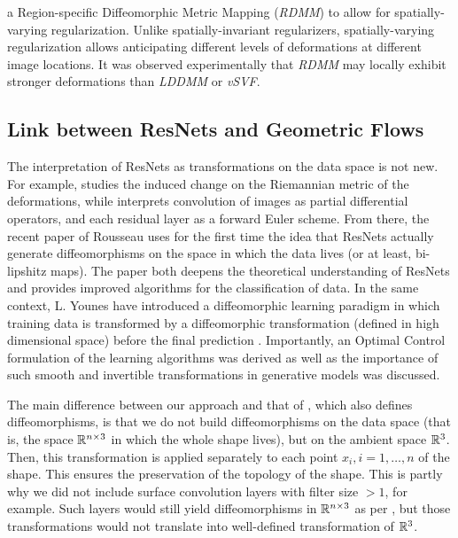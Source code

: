 \cite{shen2019region} a Region-specific Diffeomorphic Metric Mapping (\textit{RDMM}) to allow for spatially-varying regularization. Unlike spatially-invariant regularizers, spatially-varying regularization allows anticipating different levels of deformations at different image locations. It was observed experimentally that \textit{RDMM} may locally exhibit stronger deformations than \textit{LDDMM} or \textit{vSVF}. \\

\subsection{Link between ResNets and Geometric Flows}
\label{sec:LinkResNet-LDDMM}

The interpretation of ResNets as transformations on the data space is not new. For example, \cite{NIPS2017_0ebcc77d} studies the induced change on the Riemannian metric of the deformations, while \cite{ruthotto2019deep} interprets convolution of images as partial differential operators, and each residual layer as a forward Euler scheme. From there, the recent paper \cite{rousseau2020residual} of Rousseau \etal uses for the first time the idea that ResNets actually generate diffeomorphisms on the space in which the data lives (or at least, bi-lipshitz maps). The paper both deepens the theoretical understanding of ResNets and provides improved algorithms for the classification of data. In the same context, L. Younes have introduced a diffeomorphic learning paradigm in which training data is transformed by a diffeomorphic transformation (defined in high dimensional space) before the final prediction \cite{younes2019diffeomorphic}. Importantly, an Optimal Control formulation of the learning algorithms was derived as well as the importance of such smooth and invertible transformations in generative models was discussed. 

The main difference between our approach and that of  \cite{rousseau2020residual}, which also defines diffeomorphisms, is that we do not build diffeomorphisms on the data space (that is, the space $\mathbb{R}^{n\times 3}$ in which the whole shape lives), but on the ambient space $\mathbb{R}^3$. Then, this transformation is applied separately to each point $x_i, i=1,\dots,n$ of the shape. This ensures the preservation of the topology of the shape. This is partly why we did not include surface convolution layers with filter size $>1$, for example. Such layers would still yield diffeomorphisms in  $\mathbb{R}^{n\times 3}$ as per \cite{rousseau2020residual}, but those transformations would not translate into well-defined transformation of $\mathbb{R}^3$.

